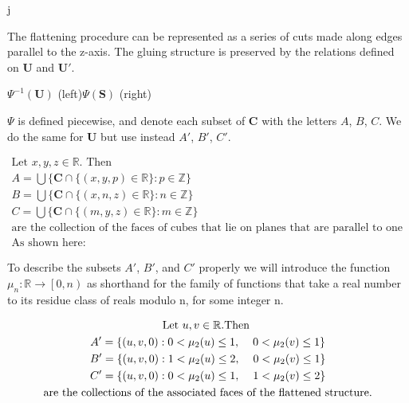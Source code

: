 j\documentclass[]{article}
\begin{document}
The flattening procedure can be represented as a series of cuts made along edges parallel to the z-axis. The gluing structure is preserved by the relations defined on $\textbf{U}$ and $\textbf{U}'$. 

\begin{center}

\raisebox{0.4in}{}
 $\Psi^{-1}(\mathbf{U})$ (left)$\Psi(\mathbf{S})$ (right)
\end{center}

$\Psi$ is defined piecewise, and denote each subset of $\mathbf{C}$ with the letters $A$, $B$, $C$. We do the same for $\mathbf{U}$ but use instead $A'$, $B'$, $C'$. 

\begin{gather*}
	\text{Let }x,y,z\in\mathbb{R}. \text{ Then}
	\\A=\bigcup\big\{\mathbf{C}\cap\{(x,y,p)\in\mathbb{R}\}: p\in\mathbb{Z}\big\}
	\\B=\bigcup\big\{\mathbf{C}\cap\{(x,n,z)\in\mathbb{R}\}: n\in\mathbb{Z}\big\}
	\\C=\bigcup\big\{\mathbf{C}\cap\{(m,y,z)\in\mathbb{R}\}: m\in\mathbb{Z}\big\}
	\\\text{are the collection of the faces of cubes that lie on planes that are parallel to one another.}
	\\\text{As shown here:}
\end{gather*}



To describe the subsets $A'$, $B'$, and $C'$ properly we will introduce the function $\mu_{n}:\mathbb{R}\rightarrow \left[0,n\right) $ as shorthand for the family of functions that take a real number to its residue class of reals modulo n, for some integer n.

\begin{gather*}
	\text{Let }u,v\in\mathbb{R}. \text{Then }
	\\A'= \{(u,v,0): 0<\mu_{2}(u)\leq 1 ,\hspace{4mm} 0<\mu_{2}(v)\leq 1\}
	\\B'= \{(u,v,0): 1<\mu_{2}(u)\leq 2,\hspace{4mm} 0<\mu_{2}(v)\leq 1\}
	\\C'= \{(u,v,0): 0<\mu_{2}(u)\leq 1,\hspace{4mm} 1<\mu_{2}(v)\leq 2\}
	\\\text{are the collections of the associated faces of the flattened structure.}
\end{gather*}
\end{document}
